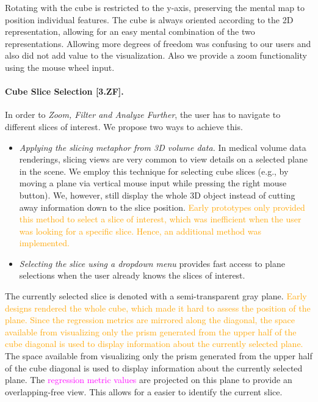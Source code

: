 \documentclass[journal]{style/vgtc} 			          %
\newcommand{\design}[1]{\textcolor{orange}{#1}}
\newcommand{\magenta}[1]{\textcolor{magenta}{#1}}
\begin{document}
Rotating with the cube is restricted to the y-axis, preserving the mental map to position individual features.
The cube is always oriented according to the 2D representation, allowing for an easy mental combination of the two representations.
Allowing more degrees of freedom was confusing to our users and also did not add value to the visualization.
Also we provide a zoom functionality using the mouse wheel input.
\paragraph{Cube Slice Selection [3.ZF].}
In order to \emph{Zoom, Filter and Analyze Further}, the user has to navigate to different slices of interest.
We propose two ways to achieve this.
\begin{itemize}
	\item \emph{Applying the slicing metaphor from 3D volume data.}
	In medical volume data renderings, slicing views are very common to view details on a selected plane in the scene.
	We employ this technique for selecting cube slices (e.g., by moving a plane via vertical mouse input while pressing the right mouse button).
	We, however, still display the whole 3D object instead of cutting away information down to the slice position.
	\design{Early prototypes only provided this method to select a slice of interest, which was inefficient when the user was looking for a specific slice.
	Hence, an additional method was implemented.
	}
	\item \emph{Selecting the slice using a dropdown menu} provides fast access to plane selections when the user already knows the slices of interest.
\end{itemize}
The currently selected slice is denoted with a semi-transparent gray plane.
\design{
Early designs rendered the whole cube, which made it hard to assess the position of the plane.
Since the regression metrics are mirrored along the diagonal, the space available from visualizing only the prism generated from the upper half of the cube diagonal is used to display information about the currently selected plane.
}
The space available from visualizing only the prism generated from the upper half of the cube diagonal is used to display information about the currently selected plane.
The \magenta{regression metric values} are projected on this plane to provide an overlapping-free view.
This allows for a easier to identify the current slice.
\end{document}
